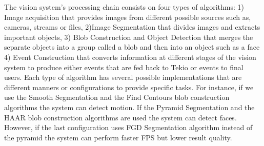 The vision system's processing chain consists on four types of algorithms: 1) Image acquisition that provides images from different possible sources such as, cameras, streams or files, 2)Image Segmentation that divides images and extracts important objects, 3) Blob Construction and Object Detection that merges the separate objects  into a group called a blob and then into an object such as a face 4) Event  Construction that converts information at different stages of the vision system to produce either events that are fed back to Tekio or events to final users. Each type of algorithm has several possible implementations that are  different manners or configurations to provide specific tasks. For instance, if we use the Smooth Segmentation and the Find Contours blob construction algorithms the system can detect motion. If the Pyramid Segmentation and the HAAR blob construction algorithms are used the system can detect faces. However, if the last configuration uses FGD Segmentation algorithm instead of the pyramid the system can perform faster FPS but lower result quality.

